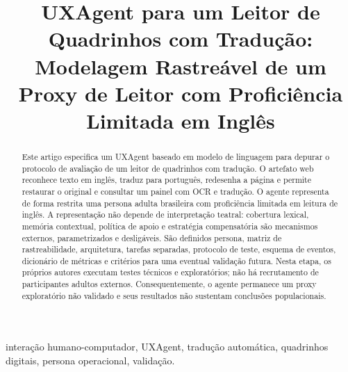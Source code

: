 \documentclass[conference]{IEEEtran}
\begin{document}
\title{UXAgent para um Leitor de Quadrinhos com Tradução:\\Modelagem Rastreável de um Proxy de Leitor com Proficiência Limitada em Inglês}

\author{
\and
{}
}

\maketitle

\begin{abstract}
Este artigo especifica um UXAgent baseado em modelo de linguagem para depurar o protocolo de avaliação de um leitor de quadrinhos com tradução. O artefato web reconhece texto em inglês, traduz para português, redesenha a página e permite restaurar o original e consultar um painel com OCR e tradução. O agente representa de forma restrita uma persona adulta brasileira com proficiência limitada em leitura de inglês. A representação não depende de interpretação teatral: cobertura lexical, memória contextual, política de apoio e estratégia compensatória são mecanismos externos, parametrizados e desligáveis. São definidos persona, matriz de rastreabilidade, arquitetura, tarefas separadas, protocolo de teste, esquema de eventos, dicionário de métricas e critérios para uma eventual validação futura. Nesta etapa, os próprios autores executam testes técnicos e exploratórios; não há recrutamento de participantes adultos externos. Consequentemente, o agente permanece um proxy exploratório não validado e seus resultados não sustentam conclusões populacionais.
\end{abstract}

\begin{IEEEkeywords}
interação humano-computador, UXAgent, tradução automática, quadrinhos digitais, persona operacional, validação.
\end{IEEEkeywords}
\end{document}
